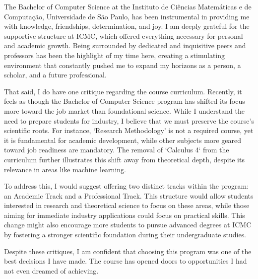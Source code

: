 The Bachelor of Computer Science at the Instituto de Ciências
Matemáticas e de Computação, Universidade de São Paulo, has been
instrumental in providing me with knowledge, friendships,
determination, and joy. I am deeply grateful for the supportive
structure at ICMC, which offered everything necessary for personal and
academic growth. Being surrounded by dedicated and inquisitive peers
and professors has been the highlight of my time here, creating a
stimulating environment that constantly pushed me to expand my
horizons as a person, a scholar, and a future professional.

That said, I do have one critique regarding the course
curriculum. Recently, it feels as though the Bachelor of Computer
Science program has shifted its focus more toward the job market than
foundational science. While I understand the need to prepare students
for industry, I believe that we must preserve the course's scientific
roots. For instance, `Research Methodology' is not a required course,
yet it is fundamental for academic development, while other subjects
more geared toward job readiness are mandatory. The removal of
`Calculus 4` from the curriculum further illustrates this shift away
from theoretical depth, despite its relevance in areas like machine
learning.

To address this, I would suggest offering two distinct tracks within
the program: an Academic Track and a Professional Track. This
structure would allow students interested in research and theoretical
science to focus on these areas, while those aiming for immediate
industry applications could focus on practical skills. This change
might also encourage more students to pursue advanced degrees at ICMC
by fostering a stronger scientific foundation during their
undergraduate studies.

Despite these critiques, I am confident that choosing this program was
one of the best decisions I have made. The course has opened doors to
opportunities I had not even dreamed of achieving.
